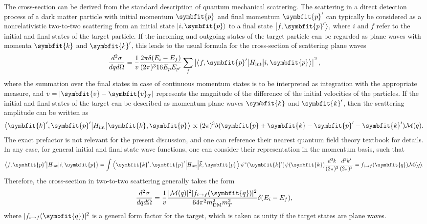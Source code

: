 \documentclass[b5paper, 10pt, twoside]{book}
\renewcommand{\vec}[1]{\symbfit{#1}}
\newcommand{\ddder}[3]{\frac{d^2#1}{d#2d#3}}
\newcommand{\ket}[1]{\left|#1\right\rangle}
\newcommand{\brakett}[3]{\left\langle#1\middle|#2\middle|#3\right\rangle}
\begin{document}
The cross-section can be derived from the standard description of quantum mechanical scattering. The scattering in a direct detection process of a dark matter particle with initial momentum $\vec{p}$ and final momentum $\vec{p}'$ can typically be considered as a nonrelativistic two-to-two scattering from an initial state $\ket{i,\vec{p}}$ to a final state $\ket{f,\vec{p}'}$, where $i$ and $f$ refer to the initial and final states of the target particle. If the incoming and outgoing states of the target particle can be regarded as plane waves with momenta $\vec{k}$ and $\vec{k}'$, this leads to the usual formula for the cross-section of scattering plane waves
\begin{equation}
\ddder{\sigma}{q}{\Omega}=\frac{1}{v}\frac{2\pi\delta(E_i-E_f)}{(2\pi)^316E_{p}E_{p'}}\sum_f\left|\brakett{f,\vec{p}'}{H_\text{int}}{i,\vec{p}}\right|^2,
\end{equation}
where the summation over the final states in case of continuous momentum states is to be interpreted as integration with the appropriate measure, and $v=|\vec{v}-\vec{v}_T|$ represents the magnitude of the difference of the initial velocities of the particles. If the initial and final states of the target can be described as momentum plane waves $\vec{k}$ and $\vec{k}'$, then the scattering amplitude can be written as
\begin{equation}
\brakett{\vec{k}',\vec{p}'}{H_\text{int}}{\vec{k},\vec{p}}\propto(2\pi)^3\delta(\vec{p}+\vec{k}-\vec{p}'-\vec{k}')\mathcal{M}(q).
\end{equation}
The exact prefactor is not relevant for the present discussion, and one can reference their nearest quantum field theory textbook for details. In any case, for general initial and final state wave functions, one can consider their representation in the momentum basis, such that
\begin{equation}
\brakett{f,\vec{p}'}{H_\text{int}}{i,\vec{p}}=\int\brakett{\vec{k}',\vec{p}'}{H_\text{int}}{\Vec{k},\vec{p}}\psi^*(\vec{k}')\psi(\vec{k})\frac{d^3k}{(2\pi)^3}\frac{d^3k'}{(2\pi)^3}=f_{i\rightarrow f}(\vec{q})\mathcal{M}(q).
\end{equation}
Therefore, the cross-section in two-to-two scattering generally takes the form
\begin{equation}
\ddder{\sigma}{q}{\Omega}=\frac{1}{v}\frac{|\mathcal{M}(q)|^2|f_{i\rightarrow f}(\vec{q})|^2}{64\pi^2m_\text{DM}^2m_T^2}\delta(E_i-E_f),
\end{equation}
where $|f_{i\rightarrow f}(\vec{q})|^2$ is a general form factor for the target, which is taken as unity if the target states are plane waves. 
\end{document}
